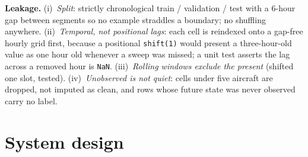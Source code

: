 \documentclass[10pt,a4paper]{article}
\newcommand{\code}[1]{\texttt{#1}}
\begin{document}
\textbf{Leakage.} (i)~\emph{Split}: strictly chronological train / validation / test with a
6-hour gap between segments so no example straddles a boundary; no shuffling anywhere.
(ii)~\emph{Temporal, not positional lags}: each cell is reindexed onto a gap-free hourly grid
first, because a positional \code{shift(1)} would present a three-hour-old value as one hour
old whenever a sweep was missed; a unit test asserts the lag across a removed hour is
\code{NaN}. (iii)~\emph{Rolling windows exclude the present} (shifted one slot, tested).
(iv)~\emph{Unobserved is not quiet}: cells under five aircraft are dropped, not imputed as
clean, and rows whose future state was never observed carry no label.

\section{System design}
\end{document}
